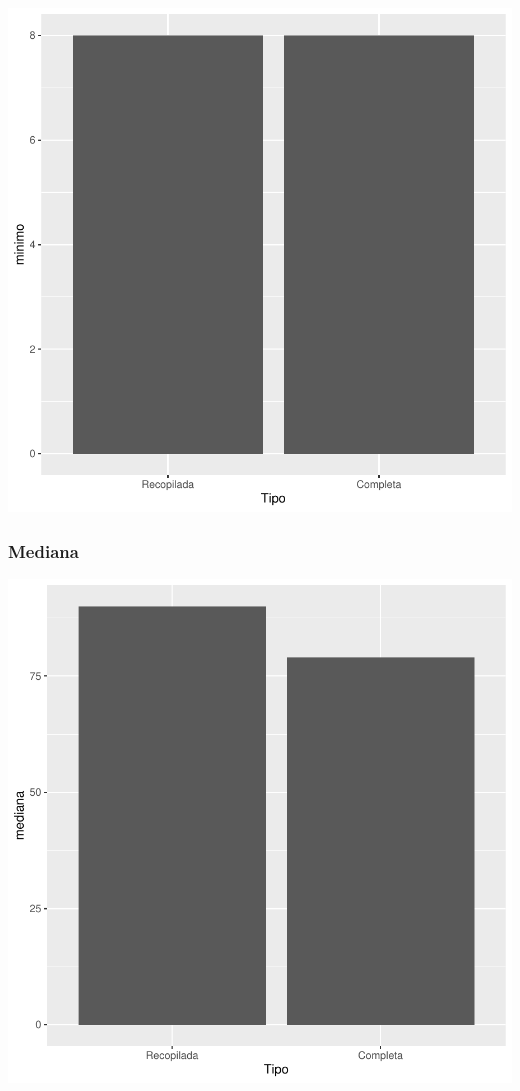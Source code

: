 \documentclass{article}
\begin{document}
\includegraphics{seguimento2-019}

\subsubsection{Mediana}

\includegraphics{seguimento2-020}
\end{document}
